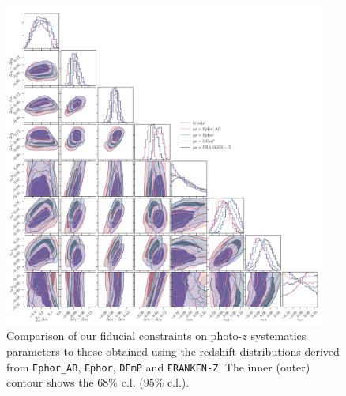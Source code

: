 \documentclass[a4paper,11pt]{article}
\begin{document}
      \begin{figure}
        \begin{center}
          \includegraphics[width=0.95\textwidth]{figures/contours-pz-syst_mPk=HOD_fix=alpha-fc-sigmaM_HOD=zevol_fit=pz-shifts-pz-widths+prior=0p2_fit=auto+cross_cosmo=const_HOD-param=zfid_clfit=HOD-zevol_pz-methods.pdf}
          \caption{Comparison of our fiducial constraints on photo-$z$ systematics parameters to those obtained using the redshift distributions derived from \texttt{Ephor\_AB}, \texttt{Ephor}, \texttt{DEmP} and \texttt{FRANKEN-Z}. The inner (outer) contour shows the $68 \%$ c.l. ($95 \%$ c.l.).}
          \label{fig:constraints-pz-syst-fit-pz-shifts+pz-widths-pz-methods}
        \end{center}
      \end{figure}
 
\end{document}
